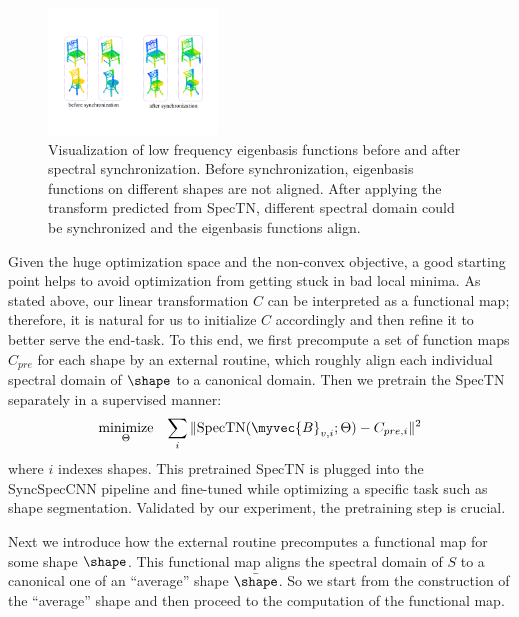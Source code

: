  
\begin{figure}[t!]
    \centering
    \includegraphics[width=0.4\textwidth]{./fig/visjointbasis2.pdf}
    \caption{Visualization of low frequency eigenbasis functions before and after spectral synchronization. Before synchronization, eigenbasis functions on different shapes are not aligned. After applying the transform predicted from SpecTN, different spectral domain could be synchronized and the eigenbasis functions align.}
    \label{fig:jointbasis}
\end{figure}

Given the huge optimization space and the non-convex objective, a good starting point helps to avoid optimization from getting stuck in bad local minima. As stated above, our linear transformation $C$ can be interpreted as a functional map; therefore, it is natural for us to initialize $C$ accordingly and then refine it to better serve the end-task. To this end, we first precompute a set of function maps $C_{pre}$ for each shape by an external routine, which roughly align each individual spectral domain of $\shape$ to a canonical domain. Then we pretrain the SpecTN separately in a supervised manner:
\begin{equation*}
\begin{aligned}
\underset{\Theta}{\mbox{minimize}} & &\sum_i \|\mbox{SpecTN}(\myvec{B}_{v, i};\Theta) - C_{pre, i}\|^2
\end{aligned}
\end{equation*}
where $i$ indexes shapes.
This pretrained SpecTN is plugged into the  SyncSpecCNN pipeline and fine-tuned while optimizing a specific task such as shape segmentation.  Validated by our experiment, the pretraining step is crucial. 

Next we introduce how the external routine precomputes a functional map for some shape $\shape$. This functional map aligns the spectral domain of $S$ to a canonical one of an ``average'' shape $\bar{\shape}$. So we start from the construction of the ``average'' shape and then proceed to the computation of the functional map. 

